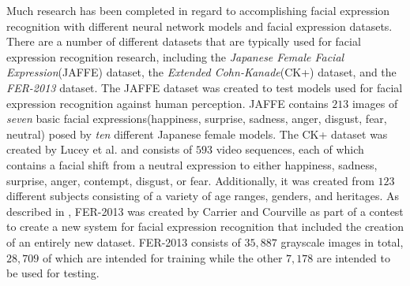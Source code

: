 \documentclass[conference]{IEEEtran}
\begin{document}

Much research has been completed in regard to accomplishing facial expression recognition with different
neural network models and facial expression datasets. There are a number of different datasets that are
typically used for facial expression recognition research, including the \textit{Japanese Female Facial Expression}(JAFFE)
dataset, the \textit{Extended Cohn-Kanade}(CK+) dataset, and the \textit{FER-2013} dataset. The JAFFE dataset was created
to test models used for facial expression recognition against human perception\cite{jaffe}. JAFFE contains $213$ images of \textit{seven}
basic facial expressions(happiness, surprise, sadness, anger, disgust, fear, neutral) posed by \textit{ten} different
Japanese female models. The CK+ dataset was created by Lucey et al. \cite{ck_plus} and consists of $593$ video sequences,
each of which contains a facial shift from a neutral expression to either happiness, sadness, surprise, anger, contempt,
disgust, or fear. Additionally, it was created from $123$ different subjects consisting of a variety of age ranges,
genders, and heritages. As described in \cite{fer2013}, FER-2013 was created by Carrier and Courville as part of a contest
to create a new system for facial expression recognition that included the creation of an entirely new dataset. FER-2013
consists of $35,887$ grayscale images in total, $28,709$ of which are intended for training while the other $7,178$ are
intended to be used for testing.
\end{document}
